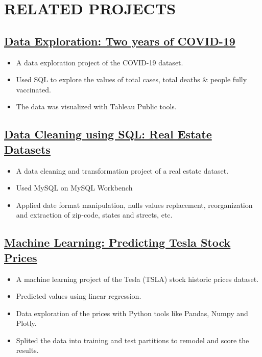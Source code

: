 \documentclass[10pt]{article} %
\begin{document}
\section*{RELATED PROJECTS}

\subsection*{\href{https://dquerales.github.io/DanielPortfolio/two_years_of_covid.html}{Data Exploration: Two years of COVID-19}}
 
\begin{itemize}
\itemsep0em
\item A data exploration project of the COVID-19 dataset.
\item Used SQL to explore the values of total cases, total deaths \& people fully vaccinated. 
\item The data was visualized with Tableau Public tools.
\end{itemize}

\subsection*{\href{https://github.com/dquerales/DataScience/tree/main/Real\%20Estate\%20Data\%20Cleaning}{Data Cleaning using SQL: Real Estate Datasets}}
 
\begin{itemize}
\itemsep0em
\item A data cleaning and transformation project of a real estate dataset.
\item Used MySQL on MySQL Workbench
\item Applied date format manipulation, nulls values replacement, reorganization and extraction of zip-code, states and streets, etc.
\end{itemize}

\subsection*{\href{https://dquerales.github.io/DanielPortfolio/linear_regression.html}{Machine Learning: Predicting Tesla Stock Prices}}

\begin{itemize}
\itemsep0em
\item A machine learning project of the Tesla (TSLA) stock historic prices dataset.
\item Predicted values using linear regression.
\item Data exploration of the prices with Python tools like Pandas, Numpy and Plotly. 
\item Splited the data into training and test partitions to remodel and score the results.
\end{itemize}
\end{document}
